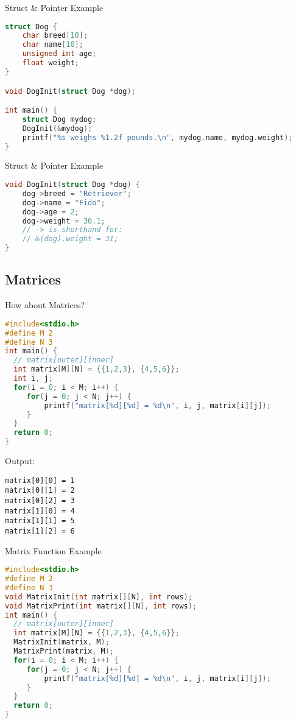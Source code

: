 \documentclass[graphics]{beamer}
\begin{document}
\begin{frame}[fragile]{Struct \& Pointer Example}
    \begin{lstlisting}[language=C,basicstyle=\scriptsize,keywordstyle=\color{blue},commentstyle=\color{green},showstringspaces=false,stringstyle=\color{red}]
struct Dog {
    char breed[10];
    char name[10];
    unsigned int age;
    float weight;
}

void DogInit(struct Dog *dog);

int main() {
    struct Dog mydog;
    DogInit(&mydog);
    printf("%s weighs %1.2f pounds.\n", mydog.name, mydog.weight);
}
    \end{lstlisting}
\end{frame}

\begin{frame}[fragile]{Struct \& Pointer Example}
    \begin{lstlisting}[language=C,basicstyle=\scriptsize,keywordstyle=\color{blue},commentstyle=\color{green},showstringspaces=false,stringstyle=\color{red}]
void DogInit(struct Dog *dog) {
    dog->breed = "Retriever";
    dog->name = "Fido";
    dog->age = 2;
    dog->weight = 30.1;
    // -> is shorthand for:
    // &(dog).weight = 31;
}
    \end{lstlisting}
\end{frame}

\subsection{Matrices}
\begin{frame}[fragile]{How about Matrices?}
    \begin{lstlisting}[language=C,basicstyle=\scriptsize,keywordstyle=\color{blue},commentstyle=\color{green},showstringspaces=false,stringstyle=\color{red}]
#include<stdio.h>
#define M 2
#define N 3
int main() {
  // matrix[outer][inner]
  int matrix[M][N] = {{1,2,3}, {4,5,6}};
  int i, j;
  for(i = 0; i < M; i++) {
     for(j = 0; j < N; j++) {
         printf("matrix[%d][%d] = %d\n", i, j, matrix[i][j]);
     }
  }
  return 0;
}
    \end{lstlisting}
    Output:
    \scriptsize
    \begin{verbatim}
matrix[0][0] = 1
matrix[0][1] = 2
matrix[0][2] = 3
matrix[1][0] = 4
matrix[1][1] = 5
matrix[1][2] = 6
    \end{verbatim}
\end{frame}

\begin{frame}[fragile]{Matrix Function Example}
    \begin{lstlisting}[language=C,basicstyle=\scriptsize,keywordstyle=\color{blue},commentstyle=\color{green},showstringspaces=false,stringstyle=\color{red}]
#include<stdio.h>
#define M 2
#define N 3
void MatrixInit(int matrix[][N], int rows);
void MatrixPrint(int matrix[][N], int rows);
int main() {
  // matrix[outer][inner]
  int matrix[M][N] = {{1,2,3}, {4,5,6}};
  MatrixInit(matrix, M);
  MatrixPrint(matrix, M);
  for(i = 0; i < M; i++) {
     for(j = 0; j < N; j++) {
         printf("matrix[%d][%d] = %d\n", i, j, matrix[i][j]);
     }
  }
  return 0;
}
    \end{lstlisting}
\end{frame}
\end{document}
